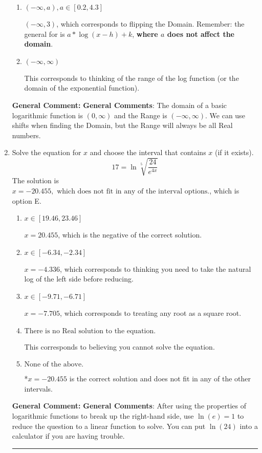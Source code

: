 \documentclass{extbook}[14pt]
\newcommand{\litem}[1]{\item #1

\rule{\textwidth}{0.4pt}}
\begin{document}
\begin{enumerate}
{\begin{enumerate}[label=\Alph*.]
$(-\infty, -9]$, which corresponds to using the negative vertical shift AND including the endpoint AND flipping the domain.
\item \( (-\infty, a), a \in [0.2, 4.3] \)

$(-\infty, 3)$, which corresponds to flipping the Domain. Remember: the general for is $a*\log(x-h)+k$, \textbf{where $a$ does not affect the domain}.
\item \( (-\infty, \infty) \)

This corresponds to thinking of the range of the log function (or the domain of the exponential function).
\end{enumerate}

\textbf{General Comment:} \textbf{General Comments}: The domain of a basic logarithmic function is $(0, \infty)$ and the Range is $(-\infty, \infty)$. We can use shifts when finding the Domain, but the Range will always be all Real numbers.
}
\litem{
 Solve the equation for $x$ and choose the interval that contains $x$ (if it exists).
\[  17 = \ln{\sqrt[5]{\frac{24}{e^{4x}}}} \]The solution is \( x = -20.455, \text{ which does not fit in any of the interval options.} \), which is option E.\begin{enumerate}[label=\Alph*.]
\item \( x \in [19.46, 23.46] \)

$x = 20.455$, which is the negative of the correct solution.
\item \( x \in [-6.34, -2.34] \)

$x = -4.336$, which corresponds to thinking you need to take the natural log of the left side before reducing.
\item \( x \in [-9.71, -6.71] \)

$x = -7.705$, which corresponds to treating any root as a square root.
\item \( \text{There is no Real solution to the equation.} \)

This corresponds to believing you cannot solve the equation.
\item \( \text{None of the above.} \)

*$x = -20.455$ is the correct solution and does not fit in any of the other intervals.
\end{enumerate}

\textbf{General Comment:} \textbf{General Comments}: After using the properties of logarithmic functions to break up the right-hand side, use $\ln(e) = 1$ to reduce the question to a linear function to solve. You can put $\ln(24)$ into a calculator if you are having trouble.
}
\end{enumerate}
\end{document}
